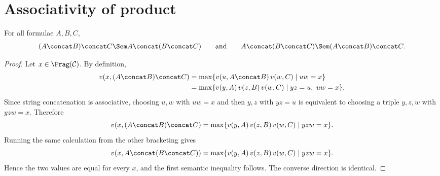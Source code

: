 \section{Associativity of product}
\begin{theorem}[Associativity]
For all formulae $A,B,C$,
\[
(A\concat B)\concat C \Sem A\concat(B\concat C)
\qquad\text{and}\qquad
A\concat(B\concat C) \Sem (A\concat B)\concat C.
\]
\end{theorem}

\begin{proof}
Let $x \in \Frag(\mathcal C)$. By definition,
\begin{align*}
v(x,(A\concat B)\concat C)
&= \max\{v(u,A\concat B)\,v(w,C) \mid uw=x\} \\
&= \max\{v(y,A)\,v(z,B)\,v(w,C) \mid yz=u,\ uw=x\}.
\end{align*}
Since string concatenation is associative, choosing $u,w$ with $uw=x$ and then $y,z$ with
$yz=u$ is equivalent to choosing a triple $y,z,w$ with $yzw=x$. Therefore
\[
v(x,(A\concat B)\concat C)
= \max\{v(y,A)\,v(z,B)\,v(w,C) \mid yzw=x\}.
\]
Running the same calculation from the other bracketing gives
\[
v(x,A\concat(B\concat C))
= \max\{v(y,A)\,v(z,B)\,v(w,C) \mid yzw=x\}.
\]
Hence the two values are equal for every $x$, and the first semantic inequality follows.
The converse direction is identical.
\end{proof}

